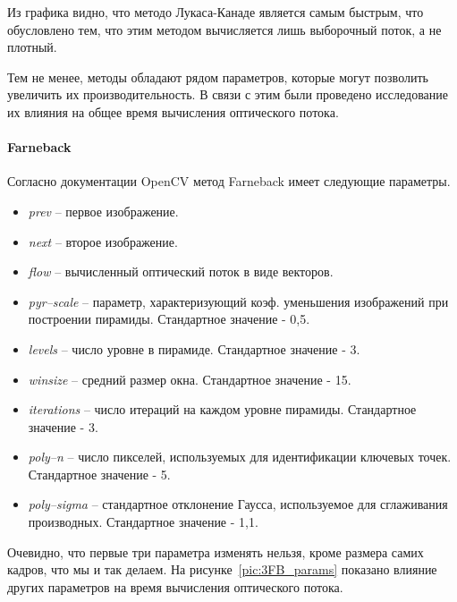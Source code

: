Из графика видно, что методо Лукаса-Канаде является самым быстрым, что обусловлено тем, что этим методом вычисляется лишь выборочный поток, а не плотный. 

Тем не менее, методы обладают рядом параметров, которые могут позволить увеличить их производительность. В связи с этим были проведено исследование их влияния на общее время вычисления оптического потока. 

\paragraph{Farneback}
Согласно документации OpenCV метод Farneback имеет следующие параметры.
\begin{itemize}
\item \textit{prev} – первое изображение.
\item \textit{next} – второе изображение.
\item \textit{flow} – вычисленный оптический поток в виде векторов. 
\item \textit{pyr--scale} – параметр, характеризующий коэф. уменьшения изображений при построении пирамиды. Стандартное значение - 0,5.
\item \textit{levels} – число уровне в пирамиде. Стандартное значение - 3.
\item \textit{winsize} – средний размер окна. Стандартное значение - 15.
\item \textit{iterations} – число итераций на каждом уровне пирамиды. Стандартное значение - 3.
\item \textit{poly--n} – число пикселей, используемых для идентификации ключевых точек. Стандартное значение - 5.
\item \textit{poly--sigma} – стандартное отклонение Гаусса, используемое для сглаживания производных. Стандартное значение - 1,1.
\end{itemize}

Очевидно, что первые три параметра изменять нельзя, кроме размера самих кадров, что мы и так делаем. 
На рисунке~\ref{pic:3FB_params} показано влияние других параметров на время вычисления оптического потока. 


